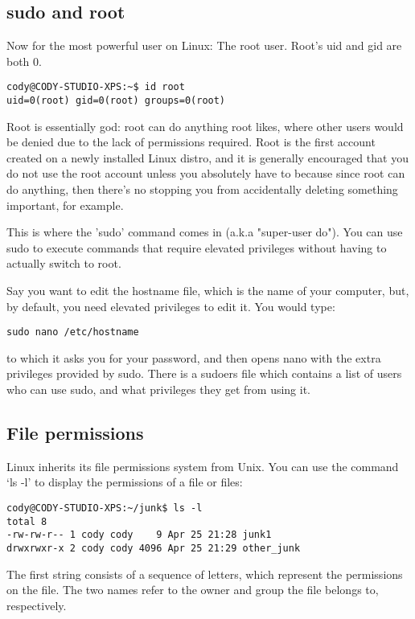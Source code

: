 \documentclass{article}
\begin{document}
\subsection{sudo and root}
Now for the most powerful user on Linux: The root user. Root's uid and gid are both 0.
\begin{verbatim}
cody@CODY-STUDIO-XPS:~$ id root
uid=0(root) gid=0(root) groups=0(root)
\end{verbatim}
Root is essentially god: root can do anything root likes, where other users would be denied due to the lack of permissions required. Root is the first account created on a newly installed Linux distro, and it is generally encouraged that you do not use the root account unless you absolutely have to because since root can do anything, then there's no stopping you from accidentally deleting something important, for example.

This is where the 'sudo' command comes in (a.k.a "super-user do"). You can use sudo to execute commands that require elevated privileges without having to actually switch to root.

Say you want to edit the hostname file, which is the name of your computer, but, by default, you need elevated privileges to edit it. You would type:
\begin{verbatim}
sudo nano /etc/hostname
\end{verbatim}
to which it asks you for your password, and then opens nano with the extra privileges provided by sudo. There is a sudoers file which contains a list of users who can use sudo, and what privileges they get from using it.

\subsection{File permissions}
Linux inherits its file permissions system from Unix. You can use the command `ls -l' to display the permissions of a file or files:
\begin{verbatim}
cody@CODY-STUDIO-XPS:~/junk$ ls -l
total 8
-rw-rw-r-- 1 cody cody    9 Apr 25 21:28 junk1
drwxrwxr-x 2 cody cody 4096 Apr 25 21:29 other_junk
\end{verbatim}
The first string consists of a sequence of letters, which represent the permissions on the file. The two names refer to the owner and group the file belongs to, respectively.
\end{document}
